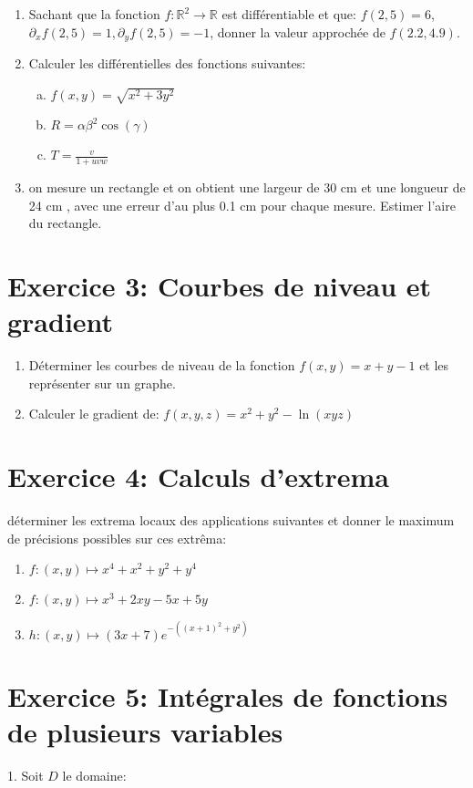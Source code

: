 \begin{enumerate}
    \item Sachant que la fonction $f: \mathbb{R}^2 \rightarrow \mathbb{R}$ est différentiable et que: $f(2,5)=6$, $\partial_x f(2,5)=1, \partial_y f(2,5)=-1$, donner la valeur approchée de $f(2.2,4.9)$.
    \item Calculer les différentielles des fonctions suivantes:
    \begin{enumerate}[a)]
        \item $f(x, y)=\sqrt{x^2+3 y^2}$
        \item $R=\alpha \beta^2 \cos (\gamma)$
        \item $T=\frac{v}{1+u v w}$
    \end{enumerate}
    \item on mesure un rectangle et on obtient une largeur de 30 cm et une longueur de 24 cm , avec une erreur d'au plus 0.1 cm pour chaque mesure. Estimer l'aire du rectangle.
\end{enumerate}

\section*{Exercice 3: Courbes de niveau et gradient}

\begin{enumerate}
    \item Déterminer les courbes de niveau de la fonction $f(x, y)=x+y-1$ et les représenter sur un graphe.
    \item Calculer le gradient de: $f(x, y, z)=x^2+y^2-\ln (x y z)$
\end{enumerate}

\section*{Exercice 4: Calculs d'extrema}
déterminer les extrema locaux des applications suivantes et donner le maximum de précisions possibles sur ces extrêma:

\begin{enumerate}
    \item $f:(x, y) \mapsto x^4+x^2+y^2+y^4$
    \item $f:(x, y) \mapsto x^3+2 x y-5 x+5 y$
    \item $h:(x, y) \mapsto(3 x+7) e^{-\left((x+1)^2+y^2\right)}$
\end{enumerate}

\section*{Exercice 5: Intégrales de fonctions de plusieurs variables}
1. Soit $D$ le domaine:

